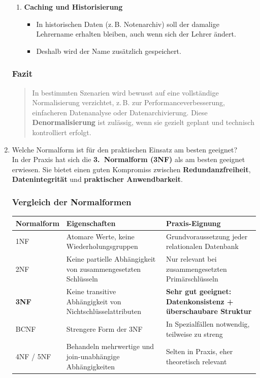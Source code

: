 \documentclass[a4paper,12pt]{article}
\begin{document}
\begin{enumerate}
\begin{enumerate}
				\item \textbf{Caching und Historisierung}
				\begin{itemize}
					\item In historischen Daten (z.\,B. Notenarchiv) soll der damalige Lehrername erhalten bleiben, auch wenn sich der Lehrer ändert.
					\item Deshalb wird der Name zusätzlich gespeichert.
				\end{itemize}
			\end{enumerate}
			
			\subsubsection*{Fazit}
			
			\begin{quote}
				In bestimmten Szenarien wird bewusst auf eine vollständige Normalisierung verzichtet, z.\,B. zur Performanceverbesserung, einfacheren Datenanalyse oder Datenarchivierung.  
				Diese \textbf{Denormalisierung} ist zulässig, wenn sie gezielt geplant und technisch kontrolliert erfolgt.
			\end{quote}
			
			\item Welche Normalform ist für den praktischen Einsatz am besten geeignet?\\
			
			In der Praxis hat sich die \textbf{3.\ Normalform (3NF)} als am besten geeignet erwiesen. Sie bietet einen guten Kompromiss zwischen \textbf{Redundanzfreiheit}, \textbf{Datenintegrität} und \textbf{praktischer Anwendbarkeit}.
			
			\vspace{1em}
			
			\subsubsection*{Vergleich der Normalformen}
			
			\begin{tabular}{|l|p{6cm}|p{5cm}|}
				\hline
				\textbf{Normalform} & \textbf{Eigenschaften} & \textbf{Praxis-Eignung} \\
				\hline
				1NF & Atomare Werte, keine Wiederholungsgruppen & Grundvoraussetzung jeder relationalen Datenbank \\
				\hline
				2NF & Keine partielle Abhängigkeit von zusammengesetzten Schlüsseln & Nur relevant bei zusammengesetzten Primärschlüsseln \\
				\hline
				\textbf{3NF} & Keine transitive Abhängigkeit von Nichtschlüsselattributen & \textbf{Sehr gut geeignet: Datenkonsistenz + überschaubare Struktur} \\
				\hline
				BCNF & Strengere Form der 3NF & In Spezialfällen notwendig, teilweise zu streng \\
				\hline
				4NF / 5NF & Behandeln mehrwertige und join-unabhängige Abhängigkeiten & Selten in Praxis, eher theoretisch relevant \\
				\hline
			\end{tabular}
			

\end{enumerate}
\end{document}
